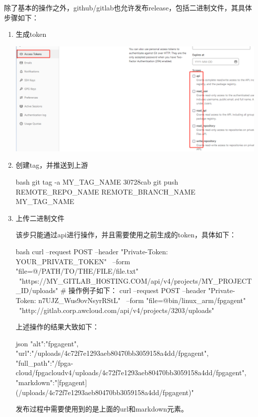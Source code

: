 除了基本的操作之外，github/gitlab也允许发布release，包括二进制文件，其具体步骤如下：
\begin{enumerate}
  \item 生成token
\par\begin{minipage}{\linewidth}
\centering
\includegraphics[width=\linewidth]{token.png}
\label{fig:token}
\end{minipage}

  \item 创建tag，并推送到上游

\begin{code-block}{bash}
git tag -a MY_TAG_NAME 30728cab
git push REMOTE_REPO_NAME REMOTE_BRANCH_NAME MY_TAG_NAME
\end{code-block}

  \item 上传二进制文件

该步只能通过api进行操作，并且需要使用之前生成的token，具体如下：
\begin{code-block}{bash}
curl --request POST --header "Private-Token: YOUR_PRIVATE_TOKEN" \
    --form "file=@/PATH/TO/THE/FILE/file.txt" \
    "https://MY_GITLAB_HOSTING.COM/api/v4/projects/MY_PROJECT_ID/uploads"
# 操作例子如下：
curl --request POST --header "Private-Token: n7UJZ_Wus9ovNsyrRStL" \
    --form "file=@bin/linux_arm/fpgagent" \
    "http://gitlab.corp.awcloud.com/api/v4/projects/3203/uploads"
\end{code-block}
上述操作的结果大致如下：
\begin{code-block}{json}
{
    "alt":"fpgagent",
    "url":"/uploads/4c72f7e1293aeb80470bb3059158a4dd/fpgagent",
    "full_path":"/fpga-cloud/fpgacloudv4/uploads/4c72f7e1293aeb80470bb3059158a4dd/fpgagent",
    "markdown":"[fpgagent](/uploads/4c72f7e1293aeb80470bb3059158a4dd/fpgagent)"
}
\end{code-block}
发布过程中需要使用到的是上面的url和markdown元素。


\end{enumerate}
